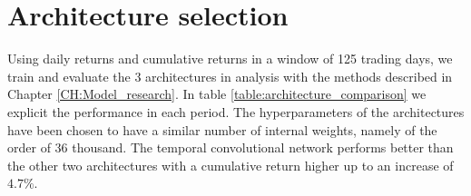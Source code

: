 \section{Architecture selection}
\label{results:architecture selection}

Using daily returns and cumulative returns in a window of 125 trading days, we train and evaluate the 3 architectures in analysis with the methods described in Chapter \ref{CH:Model_research}. In table \ref{table:architecture_comparison} we explicit the performance in each period. The hyperparameters of the architectures have been chosen to have a similar number of internal weights, namely of the order of 36 thousand. The temporal convolutional network performs better than the other two architectures with a cumulative return higher up to an increase of $4.7\%$.

\begin{table}[h]
	\caption{Architecture comparison: cumulative return in 3 different time frames \label{table:architecture_comparison}}
\end{table}


